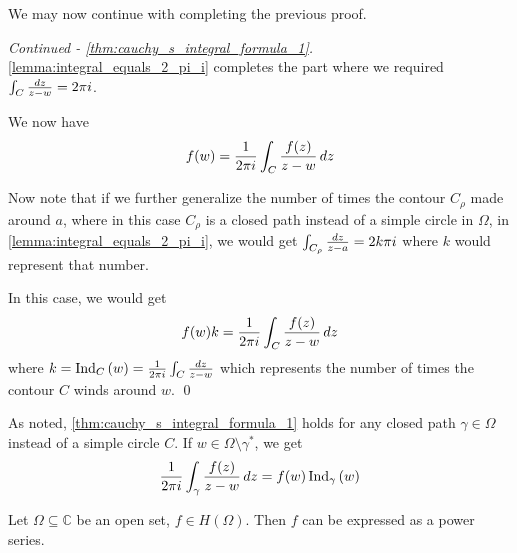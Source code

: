 \documentclass[11pt, oneside]{book}
\begin{document}
We may now continue with completing the previous proof.

\begin{proof}[Continued - \cref{thm:cauchy_s_integral_formula_1}]
	\cref{lemma:integral_equals_2_pi_i} completes the part where we required $\int_{C} \frac{\dif{z}}{z - w} = 2 \pi i$.

	We now have
	\begin{equation*}
		f(w) = \frac{1}{2 \pi i} \int_{C} \frac{f(z)}{z - w} \dif{z}
	\end{equation*}

	Now note that if we further generalize the number of times the contour $C_\rho$ made around $a$, where in this case $C_\rho$ is a closed path instead of a simple circle in $\Omega$, in \cref{lemma:integral_equals_2_pi_i}, we would get $\int_{C_\rho} \frac{\dif{z}}{z - a} = 2k \pi i$ where $k$ would represent that number.

	In this case, we would get
	\begin{equation*}
		f(w) k = \frac{1}{2 \pi i} \int_{C} \frac{f(z)}{z - w} \dif{z}
	\end{equation*}
	where $k = \ind{w}{C} = \frac{1}{2 \pi i} \int_{C} \frac{\dif{z}}{z - w}$ which represents the number of times the contour $C$ winds around $w$. \qed
\end{proof}

\begin{remark}
	As noted, \cref{thm:cauchy_s_integral_formula_1} holds for any closed path $\gamma \in \Omega$ instead of a simple circle $C$. If $w \in \Omega \setminus \gamma^*$, we get
	\begin{equation*}
		\frac{1}{2 \pi i} \int_{\gamma} \frac{f(z)}{z - w} \dif{z} = f(w) \ind{w}{\gamma}
	\end{equation*}
\end{remark}

\begin{propo}\label{propo:holomorphic_functions_can_be_expressed_as_power_series}
	Let $\Omega \subseteq \mathbb{C}$ be an open set, $f \in H(\Omega)$. Then $f$ can be expressed as a power series.
\end{propo}
\end{document}
